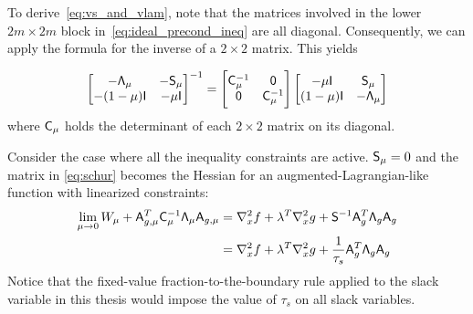 \begin{remark}
To derive~\eqref{eq:vs_and_vlam}, note that the matrices involved in the lower $2m\times 2m$ block in~\eqref{eq:ideal_precond_ineq} are all diagonal.  Consequently, we can apply the formula for the inverse of a $2\times 2$ matrix.  This yields

\begin{equation*}
\begin{bmatrix}
 -\mathsf{\Lambda}_\mu & -\mathsf{S}_\mu \\ 
 -(1-\mu)\mathsf{I} & -\mu \mathsf{I}  
\end{bmatrix}^{-1} 
= 
\begin{bmatrix}
  \mathsf{C}_\mu^{-1} & \mathsf{0} \\
    \mathsf{0} & \mathsf{C}_\mu^{-1}
  \end{bmatrix}
  \begin{bmatrix}
   -\mu \mathsf{I} & \mathsf{S}_\mu \\
    (1-\mu)\mathsf{I} & -\mathsf{\Lambda}_\mu 
  \end{bmatrix}
\end{equation*}
where $\mathsf{C}_\mu$ holds the determinant of each $2\times 2$ matrix on its diagonal.
\end{remark}

\begin{remark}
  Consider the case where all the inequality constraints are active.  $\mathsf{S}_\mu = 0$ and 
  the matrix in \eqref{eq:schur} becomes the Hessian for an
  augmented-Lagrangian-like function with linearized constraints:
  \begin{equation*}
  \begin{aligned}
    \lim_{\mu\rightarrow 0} W_{\mu} + \mathsf{A}_{g,\mu}^T \mathsf{C}_{\mu}^{-1}
    \mathsf{\Lambda}_\mu \mathsf{A}_{g,\mu} & = \nabla_x^{2} f + \lambda^T \nabla_x^2 g +
    \mathsf{S}^{-1}\mathsf{A}_g^{T} \mathsf{\Lambda}_g \mathsf{A}_g \\
    &= \nabla_x^{2} f + \lambda^T \nabla_x^2 g +
     \frac{1}{\tau_s}\mathsf{A}_g^{T} \mathsf{\Lambda}_g \mathsf{A}_g \\
   \end{aligned}
  \end{equation*}
  Notice that the fixed-value fraction-to-the-boundary rule applied to the slack variable in this thesis 
  would impose the value of $\tau_s$ on all slack variables.  
\end{remark}


